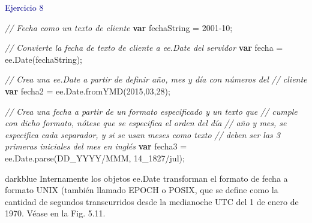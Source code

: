 \documentclass[
  12pt,
  letterpaper,
  twoside]{book}
\newenvironment{Shaded}{\begin{snugshade}}{\end{snugshade}}
\newcommand{\AttributeTok}[1]{\textcolor[rgb]{0.48,0.12,0.64}{#1}}
\newcommand{\BaseNTok}[1]{\textcolor[rgb]{0.28,0.53,0.93}{#1}}
\newcommand{\CommentTok}[1]{\textcolor[rgb]{0.24,0.58,0.00}{\textit{#1}}}
\newcommand{\DecValTok}[1]{\textcolor[rgb]{0.28,0.53,0.93}{#1}}
\newcommand{\FunctionTok}[1]{\textcolor[rgb]{0.48,0.12,0.64}{#1}}
\newcommand{\KeywordTok}[1]{\textcolor[rgb]{0.00,0.00,0.00}{\textbf{#1}}}
\newcommand{\NormalTok}[1]{#1}
\newcommand{\OperatorTok}[1]{\textcolor[rgb]{0.00,0.00,0.00}{#1}}
\newcommand{\StringTok}[1]{\textcolor[rgb]{0.87,0.29,0.22}{#1}}
\begin{document}
\textcolor{darkblue}{Ejercicio 8}

\begin{Shaded}
\begin{Highlighting}[]
\CommentTok{// Fecha como un texto de cliente}
\KeywordTok{var}\NormalTok{ fechaString }\OperatorTok{=} \StringTok{\textquotesingle{}2001{-}10\textquotesingle{}}\OperatorTok{;}

\CommentTok{// Convierte la fecha de texto de cliente a ee.Date del servidor    }
\KeywordTok{var}\NormalTok{ fecha }\OperatorTok{=}\NormalTok{ ee}\OperatorTok{.}\FunctionTok{Date}\NormalTok{(fechaString)}\OperatorTok{;}  

\CommentTok{// Crea una ee.Date a partir de definir año, mes y día con números del }
\CommentTok{// cliente           }
\KeywordTok{var}\NormalTok{ fecha2 }\OperatorTok{=}\NormalTok{ ee}\OperatorTok{.}\AttributeTok{Date}\OperatorTok{.}\FunctionTok{fromYMD}\NormalTok{(}\DecValTok{2015}\OperatorTok{,}\BaseNTok{03}\OperatorTok{,}\DecValTok{28}\NormalTok{)}\OperatorTok{;} 
   
\CommentTok{// Crea una fecha a partir de un formato especificado y un texto que }
\CommentTok{// cumple con dicho formato, nótese que se especifica el orden del día }
\CommentTok{// año y mes, se especifica cada separador, y si se usan meses como texto}
\CommentTok{// deben ser las 3 primeras iniciales del mes en inglés}
\KeywordTok{var}\NormalTok{ fecha3 }\OperatorTok{=}\NormalTok{ ee}\OperatorTok{.}\AttributeTok{Date}\OperatorTok{.}\FunctionTok{parse}\NormalTok{(}\StringTok{\textquotesingle{}DD\_YYYY/MMM\textquotesingle{}}\OperatorTok{,} \StringTok{\textquotesingle{}14\_1827/jul\textquotesingle{}}\NormalTok{)}\OperatorTok{;} 
\end{Highlighting}
\end{Shaded}

\begin{bluebox2}

\begin{awesomeblock}{5pt}{\faLightbulb}{darkblue}
Internamente los objetos ee.Date transforman el formato de fecha a formato UNIX (también llamado EPOCH o POSIX, que se define como la cantidad de segundos transcurridos desde la medianoche UTC del 1 de enero de 1970. Véase en la Fig. 5.11.

\end{awesomeblock}

\end{bluebox2}
\end{document}
